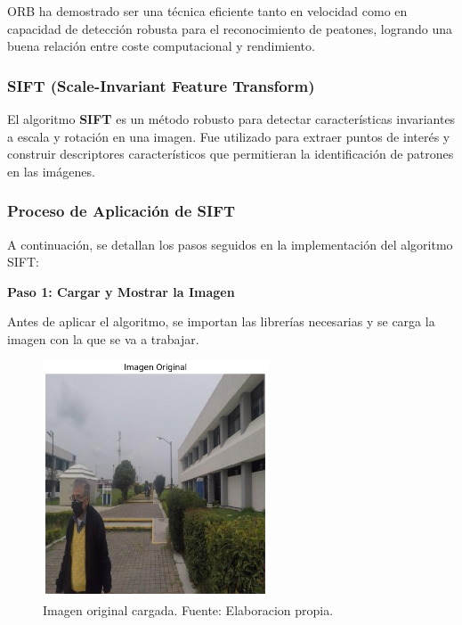 \documentclass[a4paper]{article}
\begin{document}
\par\vspace{0.5cm}
ORB ha demostrado ser una técnica eficiente tanto en velocidad como en capacidad de detección robusta para el reconocimiento de peatones, logrando una buena relación entre coste computacional y rendimiento.



\subsubsection{SIFT (Scale-Invariant Feature Transform)}

El algoritmo \textbf{SIFT} es un método robusto para detectar características invariantes a escala y rotación en una imagen. Fue utilizado para extraer puntos de interés y construir descriptores característicos que permitieran la identificación de patrones en las imágenes.

\subsubsection{Proceso de Aplicación de SIFT}

A continuación, se detallan los pasos seguidos en la implementación del algoritmo SIFT:
\par\vspace{0.5cm}

\textbf{Paso 1: Cargar y Mostrar la Imagen}
\par\vspace{0.5cm}

Antes de aplicar el algoritmo, se importan las librerías necesarias y se carga la imagen con la que se va a trabajar.

\begin{figure}[H]
    \centering
    \includegraphics[width=0.6\textwidth]{images/sift_paso_1.png}
    \caption{Imagen original cargada. Fuente: Elaboracion propia.}
\end{figure}
\end{document}
